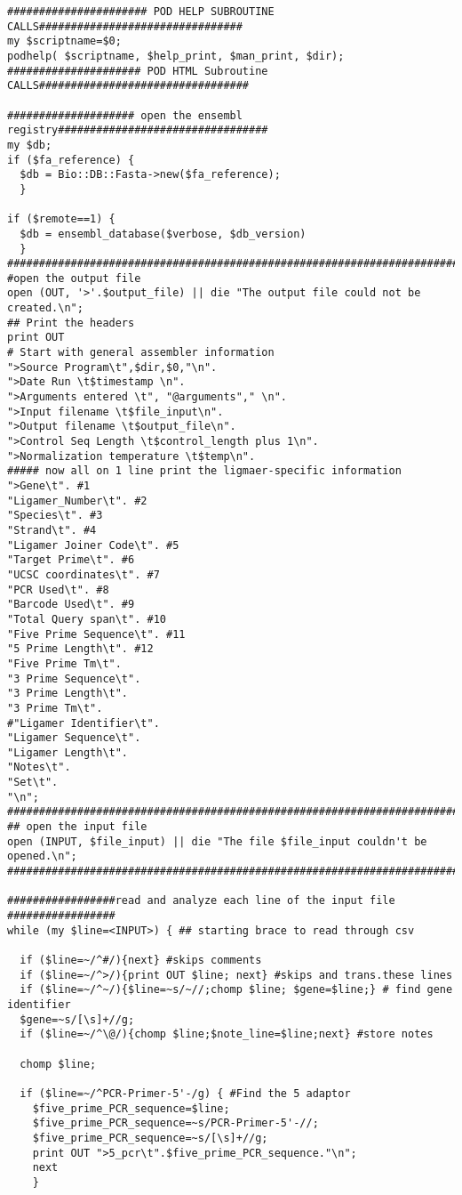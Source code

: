 \begin{lstlisting}
###################### POD HELP SUBROUTINE CALLS################################
my $scriptname=$0;
podhelp( $scriptname, $help_print, $man_print, $dir);
##################### POD HTML Subroutine CALLS#################################

#################### open the ensembl registry#################################
my $db;
if ($fa_reference) {
  $db = Bio::DB::Fasta->new($fa_reference);
  }

if ($remote==1) {
  $db = ensembl_database($verbose, $db_version)
  }
################################################################################
#open the output file
open (OUT, '>'.$output_file) || die "The output file could not be created.\n";
## Print the headers
print OUT
# Start with general assembler information
">Source Program\t",$dir,$0,"\n".
">Date Run \t$timestamp \n".
">Arguments entered \t", "@arguments"," \n".
">Input filename \t$file_input\n".
">Output filename \t$output_file\n".
">Control Seq Length \t$control_length plus 1\n".
">Normalization temperature \t$temp\n".
##### now all on 1 line print the ligmaer-specific information
">Gene\t". #1
"Ligamer_Number\t". #2
"Species\t". #3
"Strand\t". #4
"Ligamer Joiner Code\t". #5
"Target Prime\t". #6
"UCSC coordinates\t". #7
"PCR Used\t". #8
"Barcode Used\t". #9
"Total Query span\t". #10
"Five Prime Sequence\t". #11
"5 Prime Length\t". #12
"Five Prime Tm\t".
"3 Prime Sequence\t".
"3 Prime Length\t".
"3 Prime Tm\t".
#"Ligamer Identifier\t".
"Ligamer Sequence\t".
"Ligamer Length\t".
"Notes\t".
"Set\t".
"\n";
################################################################################
## open the input file
open (INPUT, $file_input) || die "The file $file_input couldn't be opened.\n";
###############################################################################

#################read and analyze each line of the input file #################
while (my $line=<INPUT>) { ## starting brace to read through csv

  if ($line=~/^#/){next} #skips comments
  if ($line=~/^>/){print OUT $line; next} #skips and trans.these lines
  if ($line=~/^~/){$line=~s/~//;chomp $line; $gene=$line;} # find gene identifier
  $gene=~s/[\s]+//g;
  if ($line=~/^\@/){chomp $line;$note_line=$line;next} #store notes

  chomp $line;

  if ($line=~/^PCR-Primer-5'-/g) { #Find the 5 adaptor
    $five_prime_PCR_sequence=$line;
    $five_prime_PCR_sequence=~s/PCR-Primer-5'-//;
    $five_prime_PCR_sequence=~s/[\s]+//g;
    print OUT ">5_pcr\t".$five_prime_PCR_sequence."\n";
    next
    }


\end{lstlisting}
